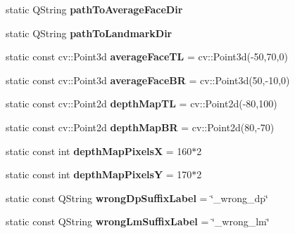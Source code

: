 \begin{DoxyCompactItemize}
\item 
\hypertarget{class_common_af5b0c933e067ce6c3eea79a0e7b50884}{static Q\+String {\bfseries path\+To\+Average\+Face\+Dir}}\label{class_common_af5b0c933e067ce6c3eea79a0e7b50884}

\item 
\hypertarget{class_common_a322e3c62ca4ee7ac7cfca0b3a0d18423}{static Q\+String {\bfseries path\+To\+Landmark\+Dir}}\label{class_common_a322e3c62ca4ee7ac7cfca0b3a0d18423}

\item 
\hypertarget{class_common_a7515c2903df61c7eb49936cbaebfe1d5}{static const cv\+::\+Point3d {\bfseries average\+Face\+T\+L} = cv\+::\+Point3d(-\/50,70,0)}\label{class_common_a7515c2903df61c7eb49936cbaebfe1d5}

\item 
\hypertarget{class_common_af53bee5a1714a036c45a48fe7e8206dd}{static const cv\+::\+Point3d {\bfseries average\+Face\+B\+R} = cv\+::\+Point3d(50,-\/10,0)}\label{class_common_af53bee5a1714a036c45a48fe7e8206dd}

\item 
\hypertarget{class_common_a5776d2df753fdb9844e23d1a66609ddf}{static const cv\+::\+Point2d {\bfseries depth\+Map\+T\+L} = cv\+::\+Point2d(-\/80,100)}\label{class_common_a5776d2df753fdb9844e23d1a66609ddf}

\item 
\hypertarget{class_common_a490dd2af55169d923454ba94aff8cc2e}{static const cv\+::\+Point2d {\bfseries depth\+Map\+B\+R} = cv\+::\+Point2d(80,-\/70)}\label{class_common_a490dd2af55169d923454ba94aff8cc2e}

\item 
\hypertarget{class_common_a59aaf57daf6194521be228155c775476}{static const int {\bfseries depth\+Map\+Pixels\+X} = 160$\ast$2}\label{class_common_a59aaf57daf6194521be228155c775476}

\item 
\hypertarget{class_common_a5e40bfe55fdfb7833a1e39424c053a9f}{static const int {\bfseries depth\+Map\+Pixels\+Y} = 170$\ast$2}\label{class_common_a5e40bfe55fdfb7833a1e39424c053a9f}

\item 
\hypertarget{class_common_afc96891dabd316bc3a01caf156a3eefd}{static const Q\+String {\bfseries wrong\+Dp\+Suffix\+Label} = \char`\"{}\+\_\+wrong\+\_\+dp\char`\"{}}\label{class_common_afc96891dabd316bc3a01caf156a3eefd}

\item 
\hypertarget{class_common_a7478dab4f6f889d09fcb4e2c8583e83d}{static const Q\+String {\bfseries wrong\+Lm\+Suffix\+Label} = \char`\"{}\+\_\+wrong\+\_\+lm\char`\"{}}\label{class_common_a7478dab4f6f889d09fcb4e2c8583e83d}


\end{DoxyCompactItemize}
